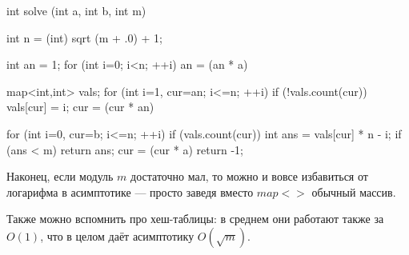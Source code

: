 \code
int solve (int a, int b, int m) {
	int n = (int) sqrt (m + .0) + 1;

	int an = 1;
	for (int i=0; i<n; ++i)
		an = (an * a) %

	map<int,int> vals;
	for (int i=1, cur=an; i<=n; ++i) {
		if (!vals.count(cur))
			vals[cur] = i;
		cur = (cur * an) %
	}

	for (int i=0, cur=b; i<=n; ++i) {
		if (vals.count(cur)) {
			int ans = vals[cur] * n - i;
			if (ans < m)
				return ans;
		}
		cur = (cur * a) %
	}
	return -1;
}
\endcode

Наконец, если модуль $m$ достаточно мал, то можно и вовсе избавиться от логарифма в асимптотике --- просто заведя вместо $map<>$ обычный массив.

Также можно вспомнить про хеш-таблицы: в среднем они работают также за $O(1)$, что в целом даёт асимптотику $O (\sqrt{m})$.